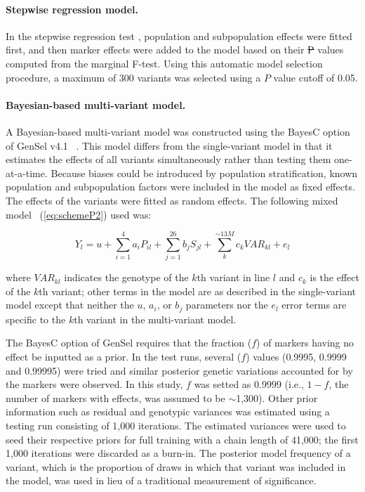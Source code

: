 \documentclass[10pt,letterpaper]{article}
\providecommand{\DIFaddtex}[1]{{\protect\color{blue}\uwave{#1}}} %
\providecommand{\DIFdeltex}[1]{{\protect\color{red}\sout{#1}}}                      %
\providecommand{\DIFaddbegin}{} %
\providecommand{\DIFaddend}{} %
\providecommand{\DIFdelbegin}{} %
\providecommand{\DIFdelend}{} %
\providecommand{\DIFadd}[1]{\texorpdfstring{\DIFaddtex{#1}}{#1}} %
\providecommand{\DIFdel}[1]{\texorpdfstring{\DIFdeltex{#1}}{}} %
\begin{document}
\paragraph{Stepwise regression model.} 
In the stepwise regression test \DIFaddbegin \DIFadd{(forward regression)}\DIFaddend , population and subpopulation effects were fitted first, and then marker effects were added to the model based on their \DIFdelbegin \DIFdel{P }\DIFdelend \DIFaddbegin \DIFadd{$P$ }\DIFaddend values computed from the marginal F-test. Using this automatic model selection procedure, a maximum of 300 variants was selected using a $P$ value cutoff of 0.05.

\paragraph{Bayesian-based multi-variant model.} 
A Bayesian-based multi-variant model was constructed using the BayesC option of GenSel v4.1 ~\cite{Habier2011}. This model differs from the single-variant model in that it estimates the effects of all variants simultaneously rather than testing them one-at-a-time. Because biases could be introduced by population stratification, known population and subpopulation factors were included in the model as fixed effects. The effects of the variants were fitted as random effects. The following mixed model ~(\ref{eq:schemeP2}) used was:  

\begin{equation}\label{eq:schemeP2} 
Y_l = u + \sum_{i=1}^{4}a_{i}P_{il} + \sum_{j=1}^{26} b_{j}S_{jl} + \sum_k^{\sim 13M}c_k VAR_{kl} + e_l
\end{equation}

where $VAR_{kl}$ indicates the genotype of the $k$th variant in line $l$ and $c_k$ is the effect of the $k$th variant; other terms in the model are as described in the single-variant model except that neither the $u$, $a_i$, or $b_j$ parameters nor the $e_l$ error terms are specific to the $k$th variant in the multi-variant model. 

The BayesC option of GenSel requires that the fraction ($f$) of markers having no effect be inputted as a prior. In the test runs, several ($f$) values (0.9995, 0.9999 and 0.99995) were tried and similar posterior genetic variations accounted for by the markers were observed. In this study, $f$ was setted as 0.9999 (i.e., $1 - f$, the number of markers with effects, was assumed to be $\sim$1,300). Other prior information such as residual and genotypic variances was estimated using a testing run consisting of 1,000 iterations. The estimated variances were used to seed their respective priors for full training with a chain length of 41,000; the first 1,000 iterations were discarded as a burn-in. The posterior model frequency of a variant, which is the proportion of draws in which that variant was included in the model, was used in lieu of a traditional measurement of significance.
\end{document}
